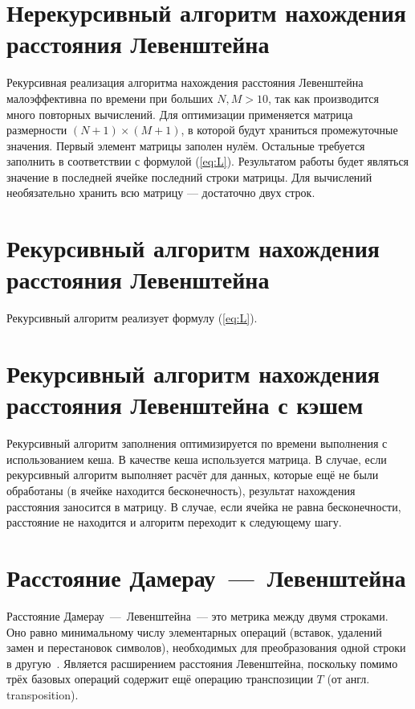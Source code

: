 \section{Нерекурсивный алгоритм нахождения расстояния Левенштейна}

Рекурсивная реализация алгоритма нахождения расстояния Левенштейна малоэффективна по времени при больших $N, M > 10$, так как производится много повторных вычислений.
Для оптимизации применяется матрица размерности $(N + 1) \times (M + 1)$, в которой будут храниться промежуточные значения. Первый элемент матрицы заполен нулём.
Остальные требуется заполнить в соответствии с формулой (\ref{eq:L}). Результатом работы будет являться значение в последней ячейке последний строки матрицы.
Для вычислений необязательно хранить всю матрицу --- достаточно двух строк.


\section{Рекурсивный алгоритм нахождения расстояния Левенштейна}

Рекурсивный алгоритм реализует формулу (\ref{eq:L}).

\section{Рекурсивный алгоритм нахождения расстояния Левенштейна с кэшем}

Рекурсивный алгоритм заполнения оптимизируется по времени выполнения с использованием кеша. В качестве кеша используется матрица.
В случае, если рекурсивный алгоритм выполняет расчёт для данных, которые ещё не были обработаны (в ячейке находится бесконечность), результат нахождения расстояния заносится в матрицу.
В случае, если ячейка не равна бесконечности, расстояние не находится и алгоритм переходит к следующему шагу.

\section{Расстояние Дамерау~---~Левенштейна}

Расстояние Дамерау~---~Левенштейна~--- это метрика между двумя строками. Оно равно минимальному числу элементарных операций (вставок, удалений замен и перестановок символов), необходимых для преобразования одной строки в другую~\cite{lev-damlev-analysis}. Является расширением расстояния Левенштейна, поскольку помимо трёх базовых операций содержит ещё операцию транспозиции $T$ (от англ. transposition).

